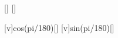 [\mps]
[\degree]

[v\cos\alpha]{\vSpX*cos(\alBX*pi/180)}[\mps]
[v\sin\alpha]{\vSpX*sin(\alBX*pi/180)}[\mps]
